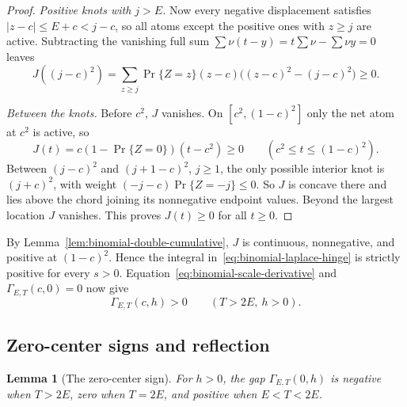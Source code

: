 \documentclass[11pt]{article}
\newtheorem{lemma}[theorem]{Lemma}
\theoremstyle{remark}
\begin{document}
\begin{proof}
\emph{Positive knots with $j>E$.} Now every negative displacement satisfies
$|z-c|\leq E+c<j-c$, so all atoms except the positive ones with $z\geq j$ are
active. Subtracting the vanishing full sum
$\sum\nu(t-y)=t\sum\nu-\sum\nu y=0$ leaves
\[
 J((j-c)^2)=\sum_{z\geq j}\Pr\{Z=z\}(z-c)
             \bigl((z-c)^2-(j-c)^2\bigr)\geq0.
\]

\emph{Between the knots.} Before $c^2$, $J$ vanishes. On
$[c^2,(1-c)^2]$ only the net atom at $c^2$ is active, so
\[
 J(t)=c(1-\Pr\{Z=0\})(t-c^2)\geq0
 \qquad(c^2\leq t\leq(1-c)^2).
\]
Between $(j-c)^2$ and $(j+1-c)^2$, $j\geq1$, the only possible interior knot
is $(j+c)^2$, with weight $(-j-c)\Pr\{Z=-j\}\leq0$. So $J$ is concave there
and lies above the chord joining its nonnegative endpoint values. Beyond the
largest location $J$ vanishes. This proves $J(t)\geq0$ for all $t\geq0$.
\end{proof}

By Lemma~\ref{lem:binomial-double-cumulative}, $J$ is continuous,
nonnegative, and positive at $(1-c)^2$. Hence the integral
in~\eqref{eq:binomial-laplace-hinge} is strictly positive for every $s>0$.
Equation~\eqref{eq:binomial-scale-derivative} and
$\Gamma_{E,T}(c,0)=0$ now give
\begin{equation}\label{eq:binomial-low-boundary-strict}
 \Gamma_{E,T}(c,h)>0\qquad(T>2E,\ h>0).
\end{equation}

\subsection{Zero-center signs and reflection}
\begin{lemma}[The zero-center sign]\label{lem:binomial-reflected-zero}
For $h>0$, the gap $\Gamma_{E,T}(0,h)$ is negative when $T>2E$, zero when
$T=2E$, and positive when $E<T<2E$.
\end{lemma}
\end{document}
